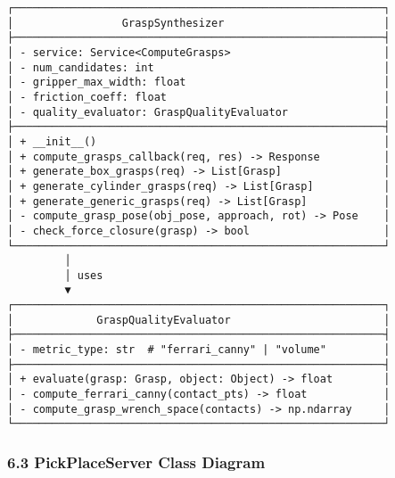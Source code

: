 \documentclass[
]{article}
\begin{document}
\begin{verbatim}
┌──────────────────────────────────────────────────────────┐
│                 GraspSynthesizer                         │
├──────────────────────────────────────────────────────────┤
│ - service: Service<ComputeGrasps>                        │
│ - num_candidates: int                                    │
│ - gripper_max_width: float                               │
│ - friction_coeff: float                                  │
│ - quality_evaluator: GraspQualityEvaluator               │
├──────────────────────────────────────────────────────────┤
│ + __init__()                                             │
│ + compute_grasps_callback(req, res) -> Response          │
│ + generate_box_grasps(req) -> List[Grasp]                │
│ + generate_cylinder_grasps(req) -> List[Grasp]           │
│ + generate_generic_grasps(req) -> List[Grasp]            │
│ - compute_grasp_pose(obj_pose, approach, rot) -> Pose    │
│ - check_force_closure(grasp) -> bool                     │
└──────────────────────────────────────────────────────────┘
         │
         │ uses
         ▼
┌──────────────────────────────────────────────────────────┐
│             GraspQualityEvaluator                        │
├──────────────────────────────────────────────────────────┤
│ - metric_type: str  # "ferrari_canny" | "volume"         │
├──────────────────────────────────────────────────────────┤
│ + evaluate(grasp: Grasp, object: Object) -> float        │
│ - compute_ferrari_canny(contact_pts) -> float            │
│ - compute_grasp_wrench_space(contacts) -> np.ndarray     │
└──────────────────────────────────────────────────────────┘
\end{verbatim}

\hypertarget{pickplaceserver-class-diagram}{%
\subsubsection{6.3 PickPlaceServer Class
Diagram}\label{pickplaceserver-class-diagram}}
\end{document}
